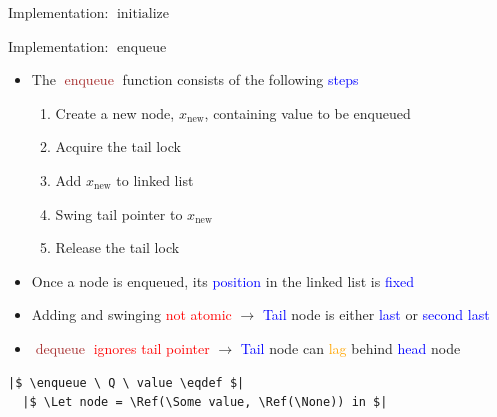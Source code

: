 \documentclass[9pt,xcolor={dvipsnames}]{beamer}
\newcommand{\initialise}{\operatorname{initialize}}
\newcommand{\enqueue}{\operatorname{enqueue}}
\newcommand{\dequeue}{\operatorname{dequeue}}
\newcommand{\locinM}[1]{\loc_{#1\_\mathrm{in}}}
\newcommand{\locoutM}[1]{\loc_{#1\_\mathrm{out}}}
\newcommand{\locN}[1]{\loc_{\mathrm{#1}}}
\newcommand{\lochead}{\locN{head}}
\newcommand{\loctail}{\locN{tail}}
\newcommand{\node}{x}
\newcommand{\nodeN}[1]{\node_{\mathrm{#1}}}
\newcommand{\nodenew}{\nodeN{new}}
\begin{document}
\begin{frame}[fragile]{Implementation: $\initialise$}
\begin{center}
{
  }
  \end{center}
\end{frame}

\begin{frame}[fragile]{Implementation: $\enqueue$}
  \begin{itemize}
    \item The \textcolor{Brown}{$\enqueue$} function consists of the following \textcolor{blue}{steps}
    \begin{enumerate}
      \item Create a new node, $\nodenew$, containing value to be enqueued
      \item Acquire the tail lock
      \item Add $\nodenew$ to linked list
      \item Swing tail pointer to $\nodenew$
      \item Release the tail lock
    \end{enumerate}
    \item Once a node is enqueued, its \textcolor{blue}{position} in the linked list is \textcolor{blue}{fixed}
    \item Adding and swinging \textcolor{red}{not atomic} $\rightarrow$ \textcolor{blue}{Tail} node is either \textcolor{blue}{last} or \textcolor{blue}{second last}
    \item \textcolor{Brown}{$\dequeue$} \textcolor{red}{ignores tail pointer} $\rightarrow$ \textcolor{blue}{Tail} node can \textcolor{orange}{lag} behind \textcolor{blue}{head} node
  \end{itemize}
  \vspace{-8pt}
  \begin{verbatim}
|$ \enqueue \ Q \ value \eqdef $|
  |$ \Let node = \Ref(\Some value, \Ref(\None)) in $|

\end{verbatim}
\end{frame}
\end{document}

